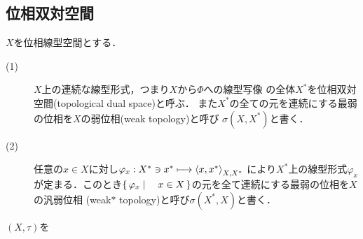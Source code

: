 \subsection{位相双対空間}
	\begin{screen}
		\begin{dfn}
			$X$を位相線型空間とする．
			\begin{description}
				\item[(1)] $X$上の連続な線型形式，つまり$X$から$\Phi$への線型写像
					の全体$X^*$を位相双対空間(topological dual space)と呼ぶ．
					また$X^*$の全ての元を連続にする最弱の位相を$X$の弱位相(weak topology)と呼び
					$\sigma(X,X^*)$と書く．
				
				\item[(2)] 任意の$x \in X$に対し$\varphi_x:X^* \ni x^* \longmapsto \inprod<x,x^*>_{X,X^*}$
					により$X^*$上の線型形式$\varphi_x$が定まる．このとき$\left\{\, \varphi_x \mid \quad x \in X\, \right\}$の元を全て連続にする最弱の位相を$X$の汎弱位相
					(weak$\ast$ topology)と呼び$\sigma(X^*,X)$と書く．
			\end{description}
		\end{dfn}
	\end{screen}
	
	\begin{screen}
		\begin{thm}
		\end{thm}
	\end{screen}
	
	\begin{screen}
		\begin{thm}[位相的双対空間の全ての元を連続にする最弱の位相は局所凸線型位相]
			$(X,\tau)$を
		\end{thm}
	\end{screen}